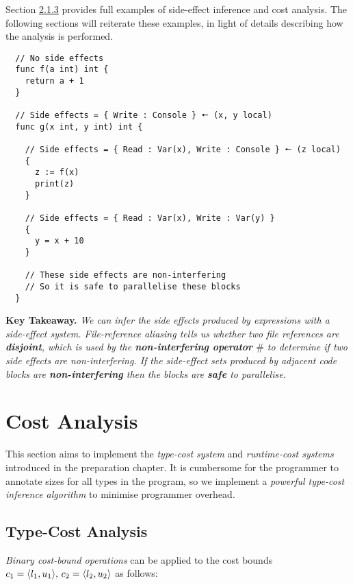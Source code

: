 \vspace{3mm}

Section \hyperref[sec:2.1.3]{2.1.3} provides full examples of side-effect inference and cost analysis. The following sections will reiterate these examples, in light of details describing how the analysis is performed.

\begin{verbatim}
  // No side effects 
  func f(a int) int { 
    return a + 1
  }

  // Side effects = { Write : Console } 🠔 (x, y local)
  func g(x int, y int) int { 

    // Side effects = { Read : Var(x), Write : Console } 🠔 (z local)
    {
      z := f(x)
      print(z)
    } 

    // Side effects = { Read : Var(x), Write : Var(y) }
    {
      y = x + 10
    }

    // These side effects are non-interfering 
    // So it is safe to parallelise these blocks 
  }
\end{verbatim}

\textbf{Key Takeaway.} \textit{We can infer the side effects produced by expressions with a side-effect system. File-reference aliasing tells us whether two file references are \textbf{disjoint}, which is used by the \textbf{non-interfering operator} \( \# \) to determine if two side effects are non-interfering. If the side-effect sets produced by adjacent code blocks are \textbf{non-interfering} then the blocks are \textbf{safe} to parallelise.}

\section{Cost Analysis}

\label{sec:3.5}

This section aims to implement the \textit{type-cost system} and \textit{runtime-cost systems} introduced in the preparation chapter. It is cumbersome for the programmer to annotate sizes for all types in the program, so we implement a \textit{powerful type-cost inference algorithm} to minimise programmer overhead.

\subsection{Type-Cost Analysis}

\label{sec:3.5.1}

\textit{Binary cost-bound operations} can be applied to the cost bounds \( c_1 = \langle{l_1, u_1}\rangle, \, c_2 = \langle{l_2, u_2}\rangle \) as follows:


